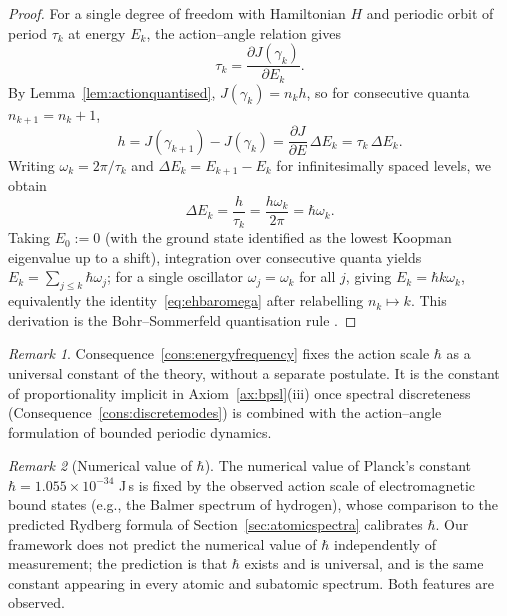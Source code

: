 \documentclass[11pt,twocolumn,a4paper]{article}
\theoremstyle{axiomstyle}
\theoremstyle{conseqstyle}
\theoremstyle{definition}
\theoremstyle{remark}
\newtheorem*{remark}{Remark}
\begin{document}
\begin{proof}
For a single degree of freedom with Hamiltonian $H$ and periodic orbit of period $\tau_{k}$ at energy $E_{k}$, the action--angle relation gives
\begin{equation*}
\tau_{k}=\frac{\partial J(\gamma_{k})}{\partial E_{k}}.
\end{equation*}
By Lemma~\ref{lem:actionquantised}, $J(\gamma_{k})=n_{k}h$, so for consecutive quanta $n_{k+1}=n_{k}+1$,
\begin{equation*}
h=J(\gamma_{k+1})-J(\gamma_{k})=\frac{\partial J}{\partial E}\,\Delta E_{k}=\tau_{k}\,\Delta E_{k}.
\end{equation*}
Writing $\omega_{k}=2\pi/\tau_{k}$ and $\Delta E_{k}=E_{k+1}-E_{k}$ for infinitesimally spaced levels, we obtain
\begin{equation*}
\Delta E_{k}=\frac{h}{\tau_{k}}=\frac{h\omega_{k}}{2\pi}=\hbar\omega_{k}.
\end{equation*}
Taking $E_{0}:=0$ (with the ground state identified as the lowest Koopman eigenvalue up to a shift), integration over consecutive quanta yields $E_{k}=\sum_{j\le k}\hbar\omega_{j}$; for a single oscillator $\omega_{j}=\omega_{k}$ for all $j$, giving $E_{k}=\hbar k\omega_{k}$, equivalently the identity~\eqref{eq:ehbaromega} after relabelling $n_{k}\mapsto k$. This derivation is the Bohr--Sommerfeld quantisation rule \citep{bohr1913,sommerfeld1915,einstein1917}.
\end{proof}

\begin{remark}
Consequence~\ref{cons:energyfrequency} fixes the action scale $\hbar$ as a universal constant of the theory, without a separate postulate. It is the constant of proportionality implicit in Axiom~\ref{ax:bpsl}(iii) once spectral discreteness (Consequence~\ref{cons:discretemodes}) is combined with the action--angle formulation of bounded periodic dynamics.
\end{remark}

\begin{remark}[Numerical value of $\hbar$]
The numerical value of Planck's constant $\hbar=1.055\times 10^{-34}$ J\,s is fixed by the observed action scale of electromagnetic bound states (e.g., the Balmer spectrum of hydrogen), whose comparison to the predicted Rydberg formula of Section~\ref{sec:atomicspectra} calibrates $\hbar$. Our framework does not predict the numerical value of $\hbar$ independently of measurement; the prediction is that $\hbar$ exists and is universal, and is the same constant appearing in every atomic and subatomic spectrum. Both features are observed.
\end{remark}
\end{document}
